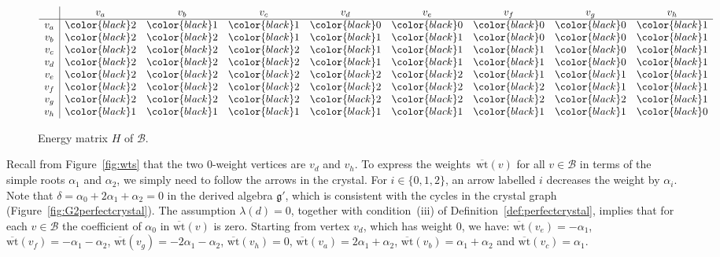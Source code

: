 \documentclass[pdftex]{sigma}
\numberwithin{equation}{section}
\theoremstyle{definition}
\begin{document}
\begin{figure}[t]
\centering
$
\begin{array}{c|cccccccc}
& v_a & v_b & v_c & v_d & v_e & v_f & v_g & v_h \\
\hline
v_a & {\color{black}2} & {\color{black}1} & {\color{black}1} & {\color{black}0} & {\color{black}0} & {\color{black}0} & {\color{black}0} & {\color{black}1} \\
v_b & {\color{black}2} & {\color{black}2} & {\color{black}1} & {\color{black}1} & {\color{black}1} & {\color{black}0} & {\color{black}0} & {\color{black}1} \\
v_c & {\color{black}2} & {\color{black}2} & {\color{black}2} & {\color{black}1} & {\color{black}1} & {\color{black}1} & {\color{black}0} & {\color{black}1} \\
v_d & {\color{black}2} & {\color{black}2} & {\color{black}2} & {\color{black}1} & {\color{black}1} & {\color{black}1} & {\color{black}0} & {\color{black}1} \\
v_e & {\color{black}2} & {\color{black}2} & {\color{black}2} & {\color{black}2} & {\color{black}2} & {\color{black}1} & {\color{black}1} & {\color{black}1} \\
v_f & {\color{black}2} & {\color{black}2} & {\color{black}2} & {\color{black}2} & {\color{black}2} & {\color{black}2} & {\color{black}1} & {\color{black}1} \\
v_g & {\color{black}2} & {\color{black}2} & {\color{black}2} & {\color{black}2} & {\color{black}2} & {\color{black}2} & {\color{black}2} & {\color{black}1} \\
v_h & {\color{black}1} & {\color{black}1} & {\color{black}1} & {\color{black}1} & {\color{black}1} & {\color{black}1} & {\color{black}1} & {\color{black}0} \\
\end{array}
$
\caption{Energy matrix $H$ of $\mathcal{B}$.}
\label{fig:G2energyfn}
\end{figure}

Recall from Figure~\ref{fig:wts} that the two 0-weight vertices are $v_d$ and $v_h$. To express the weights~$\overline{\mathrm{wt}}(v)$ for all $v\in\mathcal{B}$ in terms of the simple roots $\alpha_1$ and $\alpha_2$, we simply need to follow the arrows in the crystal. For $i \in \{0,1,2\}$, an arrow labelled $i$ decreases the weight by $\alpha_i$. Note that $\delta = \alpha_0 + 2\alpha_1 + \alpha_2 = 0$ in the derived algebra $\mathfrak{g}'$, which is consistent with the cycles in the crystal graph (Figure~\ref{fig:G2perfectcrystal}). The assumption $\lambda(d)=0$, together with condition~(iii) of Definition~\ref{def:perfectcrystal}, implies that for each $v\in\mathcal{B}$ the coefficient of $\alpha_0$ in $\overline{\mathrm{wt}}(v)$ is zero. Starting from vertex $v_d$, which has weight $0$, we have: $\overline{\mathrm{wt}}(v_e)= -\alpha_1$, $\overline{\mathrm{wt}}(v_f)= -\alpha_1-\alpha_2$, $\overline{\mathrm{wt}}(v_g)= -2\alpha_1-\alpha_2$, $\overline{\mathrm{wt}}(v_h)= 0$, $\overline{\mathrm{wt}}(v_a)= 2\alpha_1+\alpha_2$, $\overline{\mathrm{wt}}(v_b)= \alpha_1+\alpha_2$ and $\overline{\mathrm{wt}}(v_c)= \alpha_1$.
\end{document}
